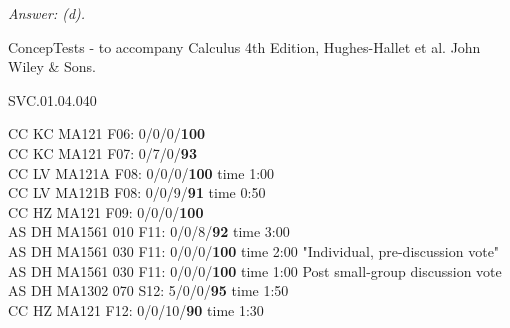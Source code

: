 {\it Answer: (d).} 

\medskip
ConcepTests - to accompany Calculus 4th Edition, Hughes-Hallet et al. John Wiley \& Sons.

SVC.01.04.040


CC KC MA121 F06: 0/0/0/{\bf 100} \\
CC KC MA121 F07: 0/7/0/{\bf93} \\
CC LV MA121A F08: 0/0/0/{\bf100} time 1:00\\
CC LV MA121B F08: 0/0/9/{\bf91} time 0:50\\
CC HZ MA121 F09: 0/0/0/{\bf100}  \\
AS DH MA1561 010 F11: 0/0/8/{\bf92} time 3:00  \\
AS DH MA1561 030 F11: 0/0/0/{\bf100} time 2:00 "Individual, pre-discussion vote" \\
AS DH MA1561 030 F11: 0/0/0/{\bf100} time 1:00 Post small-group discussion vote \\
AS DH MA1302 070 S12: 5/0/0/{\bf95} time 1:50  \\
CC HZ MA121 F12: 0/0/10/{\bf90} time 1:30  \\
